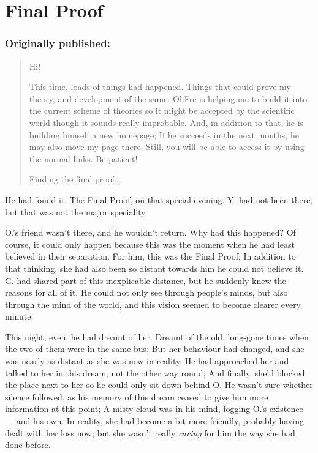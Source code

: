 \chapter{Final Proof}
\label{cha:final-proof}
\subsection*{Originally published: }
\begin{quote}
Hi! 

This time, loads of things had happened. Things that could prove my theory, and development of the same. OliFre is helping me to build it into the current scheme of theories so it might be accepted by the scientific world though it sounds really improbable. 
And, in addition to that, he is building himself a new homepage; If he succeeds in the next months, he may also move my page there. Still, you will be able to access it by using the normal links. Be patient!

Finding the final proof\dots{}
\end{quote}

He had found it. 
The Final Proof, on that special evening. 
Y. had not been there, but that was not the major speciality.

O.'s friend wasn't there, and he wouldn't return. Why had this happened? Of course, it could only happen because this was the moment when he had least believed in their separation. For him, this was the Final Proof; In addition to that thinking, she had also been so distant towards him he could not believe it. G. had shared part of this inexplicable distance, but he suddenly knew the reasons for all of it. He could not only see through people's minds, but also through the mind of the world, and this vision seemed to become clearer every minute.

This night, even, he had dreamt of her. Dreamt of the old, long-gone times when the two of them were in the same bus; But her behaviour had changed, and she was nearly as distant as she was now in reality. He had approached her and talked to her in this dream, not the other way round; And finally, she'd blocked the place next to her so he could only sit down behind O. He wasn't sure whether silence followed, as his memory of this dream ceased to give him more information at this point; A misty cloud was in his mind, fogging O.'s existence --- and his own.
In reality, she had become a bit more friendly, probably having dealt with her loss now; but she wasn't really \emph{caring} for him the way she had done before.

